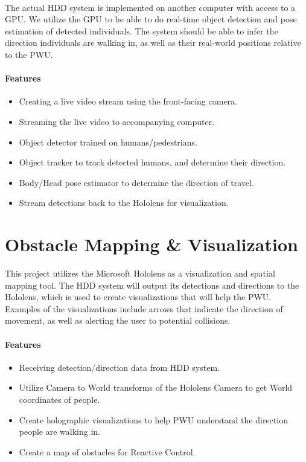 \paragraph{}The actual HDD system is implemented on another computer with access to a GPU. We utilize the GPU to be able to do real-time object detection and pose estimation of detected individuals. The system should be able to infer the direction individuals are walking in, as well as their real-world positions relative to the PWU.

\paragraph{Features} 
\begin{itemize}
    \item Creating a live video stream using the front-facing camera.
    \item Streaming the live video to accompanying computer.
    \item Object detector trained on humans/pedestrians.
    \item Object tracker to track detected humans, and determine their direction.
    \item Body/Head pose estimator to determine the direction of travel.
    \item Stream detections back to the Hololens for visualization.
\end{itemize}

\section{Obstacle Mapping \& Visualization }
This project utilizes the Microsoft Hololens as a visualization and spatial mapping tool. The HDD system will output its detections and directions to the Hololens, which is used to create visualizations that will help the PWU. Examples of the visualizations include arrows that indicate the direction of movement, as well as alerting the user to potential collisions.

\paragraph{Features}
\begin{itemize}
    \item Receiving detection/direction data from HDD system.
    \item Utilize Camera to World transforms of the Hololens Camera to get World coordinates of people.
    \item Create holographic visualizations to help PWU understand the direction people are walking in.
    \item Create a map of obstacles for Reactive Control.
\end{itemize}
 
